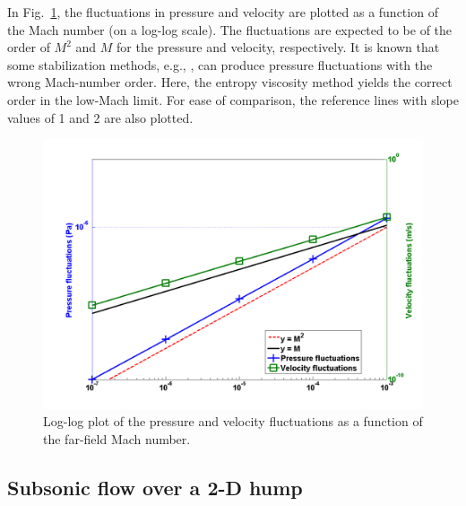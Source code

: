 \documentclass[preprint,10pt]{elsarticle}
\newcommand{\fig}[1]{Fig.~\ref{#1}}                      %
\newcommand{\tcr}[1]{\textcolor{red}{#1}}
\newcommand{\tcb}[1]{\textcolor{blue}{#1}}
\begin{document}
%
In \fig{fig:pressure_vel_fluc}, the fluctuations in pressure and velocity are plotted as a function of the Mach number (on a log-log scale). The fluctuations are expected to be of the order of $M^2$ and $M$ for the pressure and velocity, respectively. It is known that some stabilization methods, e.g., \cite{LowMach1, LowMach2, LowMach3}, can produce pressure fluctuations with the wrong Mach-number order. Here, the entropy viscosity method yields the correct order in the low-Mach limit. For ease of comparison, the reference lines with slope values of 1 and 2 are also plotted.
%
\begin{figure}[H]
\centering
\includegraphics[width=\textwidth]{pressure_fluctuation.png}
\caption{Log-log plot of the pressure and velocity fluctuations as a function of the far-field Mach number.}
\label{fig:pressure_vel_fluc}
\end{figure}

\subsection{Subsonic flow over a 2-D hump} \label{sec:hump}
\end{document}
